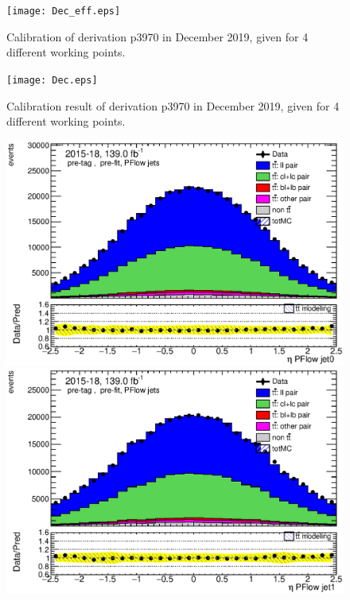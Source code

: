 \documentclass[letterpaper,12pt]{article}
\begin{document}
\begin{figure}
\texttt{[image: Dec\_eff.eps]}
\caption{Calibration of derivation p3970 in December 2019, given for  4 different working points.}\label{fig:Dec_eff}
\end{figure}

\begin{figure}
\texttt{[image: Dec.eps]}
\caption{Calibration result of derivation p3970 in December 2019, given for  4 different working points.}\label{fig:Dec}
\end{figure}





	
	\begin{figure}
	\begin{minipage}[b]{.45\textwidth}
	\centering
	\includegraphics[width=1\textwidth]{Oct_distributions/pretagNoRwDL1rwithhighpTPFlow_scaledall/DataMC_J0_eta.eps}
	\end{minipage}\hfill
	\begin{minipage}[b]{.45\textwidth}
	\centering
	\includegraphics[width=1\textwidth]{Oct_distributions/pretagNoRwDL1rwithhighpTPFlow_scaledall/DataMC_J1_eta.eps}

\end{minipage}
\end{figure}
\end{document}
